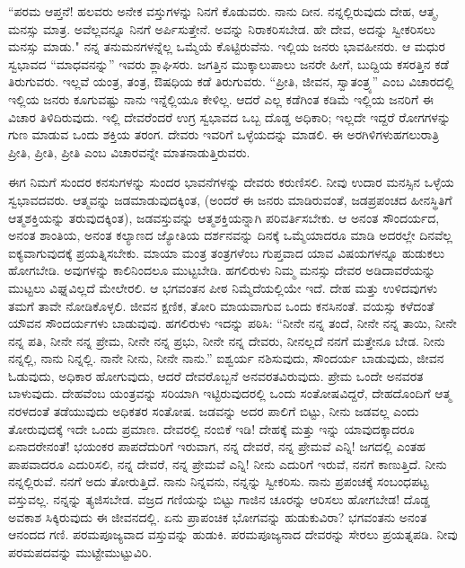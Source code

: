 ``ಪರಮ ಆಪ್ತನೆ! ಹಲವರು ಅನೇಕ ವಸ್ತುಗಳನ್ನು ನಿನಗೆ ಕೊಡುವರು. ನಾನು ದೀನ. ನನ್ನಲ್ಲಿರುವುದು ದೇಹ, ಆತ್ಮ, ಮನಸ್ಸು ಮಾತ್ರ. ಅವೆಲ್ಲವನ್ನೂ ನಿನಗೆ ಅರ್ಪಿಸುತ್ತೇನೆ. ಅವನ್ನು ನಿರಾಕರಿಸಬೇಡ. ಹೇ ದೇವ, ಅದನ್ನು ಸ್ವೀಕರಿಸಲು ಮನಸ್ಸು ಮಾಡು." ನನ್ನ ತನುಮನಗಳನ್ನೆಲ್ಲ ಒಮ್ಮೆಯೆ ಕೊಟ್ಟಿರುವೆನು. ಇಲ್ಲಿಯ ಜನರು ಭಾವಹೀನರು. ಆ ಮಧುರ ಸ್ವಭಾವದ ``ಮಾಧವನನ್ನು'' ಇವರು ಶ್ಲಾಘಿಸರು. ಜಗತ್ತಿನ ಮುಕ್ಕಾಲುಪಾಲು ಜನರೇ ಹೀಗೆ, ಬುದ್ದಿಯ ಕಸರತ್ತಿನ ಕಡೆ ತಿರುಗುವರು. ಇಲ್ಲವೆ ಯಂತ್ರ, ತಂತ್ರ, ಔಷಧಿಯ ಕಡೆ ತಿರುಗುವರು. ``ಪ್ರೀತಿ, ಜೀವನ, ಸ್ವಾತಂತ್ರ್ಯ'' ಎಂಬ ವಿಚಾರದಲ್ಲಿ ಇಲ್ಲಿಯ ಜನರು ಕೂಗುವಷ್ಟು ನಾನು ಇನ್ನೆಲ್ಲಿಯೂ ಕೇಳಿಲ್ಲ. ಆದರೆ ಎಲ್ಲ ಕಡೆಗಿಂತ ಕಡಿಮೆ ಇಲ್ಲಿಯ ಜನರಿಗೆ ಈ ವಿಚಾರ ತಿಳಿದಿರುವುದು. ಇಲ್ಲಿ ದೇವರೆಂದರೆ ಉಗ್ರ ಸ್ವಭಾವದ ಒಬ್ಬ ದೊಡ್ಡ ಅಧಿಕಾರಿ; ಇಲ್ಲದೇ ಇದ್ದರೆ ರೋಗಗಳನ್ನು ಗುಣ ಮಾಡುವ ಒಂದು ಶಕ್ತಿಯ ತರಂಗ. ದೇವರು ಇವರಿಗೆ ಒಳ್ಳೆಯದನ್ನು ಮಾಡಲಿ. ಈ ಅರಗಿಳಿಗಳುಹಗಲುರಾತ್ರಿ ಪ್ರೀತಿ, ಪ್ರೀತಿ, ಪ್ರೀತಿ ಎಂಬ ವಿಚಾರವನ್ನೇ ಮಾತನಾಡುತ್ತಿರುವರು.

ಈಗ ನಿಮಗೆ ಸುಂದರ ಕನಸುಗಳನ್ನು ಸುಂದರ ಭಾವನೆಗಳನ್ನು ದೇವರು ಕರುಣಿಸಲಿ. ನೀವು ಉದಾರ ಮನಸ್ಸಿನ ಒಳ್ಳೆಯ ಸ್ವಭಾವದವರು. ಆತ್ಮವನ್ನು ಜಡಮಾಡುವುದಕ್ಕಿಂತ, (ಅಂದರೆ ಈ ಜನರು ಮಾಡಿರುವಂತೆ, ಜಡಪ್ರಪಂಚದ ಹೀನಸ್ಥಿತಿಗೆ ಆತ್ಮಶಕ್ತಿಯನ್ನು ತರುವುದಕ್ಕಿಂತ), ಜಡವಸ್ತುವನ್ನು ಆತ್ಮಶಕ್ತಿಯನ್ನಾಗಿ ಪರಿವರ್ತಿಸಬೇಕು. ಆ ಅನಂತ ಸೌಂದರ್ಯದ, ಅನಂತ ಶಾಂತಿಯ, ಅನಂತ ಕಲ್ಯಾಣದ ಜ್ಯೋತಿಯ ದರ್ಶನವನ್ನು ದಿನಕ್ಕೆ ಒಮ್ಮೆಯಾದರೂ ಮಾಡಿ ಅದರಲ್ಲೇ ದಿನವೆಲ್ಲ ಐಕ್ಯವಾಗುವುದಕ್ಕೆ ಪ್ರಯತ್ನಿಸಬೇಕು. ಮಾಯಾ ಮಂತ್ರ ತಂತ್ರಗಳೆಂಬ ಗುಪ್ತವಾದ ಯಾವ ವಿಷಯಗಳನ್ನೂ ಹುಡುಕಲು ಹೋಗಬೇಡಿ. ಅವುಗಳನ್ನು ಕಾಲಿನಿಂದಲೂ ಮುಟ್ಟಬೇಡಿ. ಹಗಲಿರುಳು ನಿಮ್ಮ ಮನಸ್ಸು ದೇವರ ಅಡಿದಾವರೆಯನ್ನು ಮುಟ್ಟಲು ವಿಘ್ನವಿಲ್ಲದೆ ಮೇಲೇರಲಿ. ಆ ಭಗವಂತನ ಪೀಠ ನಿಮ್ಮೆದೆಯಲ್ಲಿಯೇ ಇದೆ. ದೇಹ ಮತ್ತು ಉಳಿದವುಗಳು ತಮಗೆ ತಾವೇ ನೋಡಿಕೊಳ್ಳಲಿ. ಜೀವನ ಕ್ಷಣಿಕ, ತೋರಿ ಮಾಯವಾಗುವ ಒಂದು ಕನಸಿನಂತೆ. ವಯಸ್ಸು ಕಳೆದಂತೆ ಯೌವನ ಸೌಂದರ್ಯಗಳು ಬಾಡುವುವು. ಹಗಲಿರುಳು ಇದನ್ನು ಪಠಿಸಿ: ``ನೀನೇ ನನ್ನ ತಂದೆ, ನೀನೇ ನನ್ನ ತಾಯಿ, ನೀನೇ ನನ್ನ ಪತಿ, ನೀನೇ ನನ್ನ ಪ್ರೇಮ, ನೀನೇ ನನ್ನ ಪ್ರಭು, ನೀನೇ ನನ್ನ ದೇವರು, ನೀನಲ್ಲದೆ ನನಗೆ ಮತ್ತೇನೂ ಬೇಡ. ನೀನು ನನ್ನಲ್ಲಿ, ನಾನು ನಿನ್ನಲ್ಲಿ. ನಾನೇ ನೀನು, ನೀನೇ ನಾನು.'' ಐಶ್ವರ್ಯ ನಶಿಸುವುದು, ಸೌಂದರ್ಯ ಬಾಡುವುದು, ಜೀವನ ಓಡುವುದು, ಅಧಿಕಾರ ಹೋಗುವುದು, ಆದರೆ ದೇವರೊಬ್ಬನೆ ಅನವರತವಿರುವುದು. ಪ್ರೇಮ ಒಂದೇ ಅನವರತ ಬಾಳುವುದು. ದೇಹವೆಂಬ ಯಂತ್ರವನ್ನು ಸರಿಯಾಗಿ ಇಟ್ಟಿರುವುದರಲ್ಲಿ ಒಂದು ಸಂತೋಷವಿದ್ದರೆ, ದೇಹದೊಂದಿಗೆ ಆತ್ಮ ನರಳದಂತೆ ತಡೆಯುವುದು ಅಧಿಕತರ ಸಂತೋಷ. ಜಡವನ್ನು ಅದರ ಪಾಲಿಗೆ ಬಿಟ್ಟು, ನೀನು ಜಡವಲ್ಲ ಎಂದು ತೋರುವುದಕ್ಕೆ ಇದೇ ಒಂದು ಪ್ರಮಾಣ. ದೇವರಲ್ಲಿ ನಂಬಿಕೆ ಇಡಿ! ದೇಹಕ್ಕೆ ಮತ್ತು ಇನ್ನು ಯಾವುದಕ್ಕಾದರೂ ಏನಾದರೇನಂತೆ! ಭಯಂಕರ ಪಾಪದೆದುರಿಗೆ ಇರುವಾಗ, ನನ್ನ ದೇವರೆ, ನನ್ನ ಪ್ರೇಮವೆ ಎನ್ನಿ! ಜಗದಲ್ಲಿ ಎಂತಹ ಪಾಪವಾದರೂ ಎದುರಿಸಲಿ, ನನ್ನ ದೇವರೆ, ನನ್ನ ಪ್ರೇಮವೆ ಎನ್ನಿ! ನೀನು ಎದುರಿಗೆ ಇರುವೆ, ನನಗೆ ಕಾಣುತ್ತಿದೆ. ನೀನು ನನ್ನಲ್ಲಿರುವೆ. ನನಗೆ ಅದು ತೋರುತ್ತಿದೆ. ನಾನು ನಿನ್ನವನು, ನನ್ನನ್ನು ಸ್ವೀಕರಿಸು. ನಾನು ಪ್ರಪಂಚಕ್ಕೆ ಸಂಬಂಧಪಟ್ಟ ವಸ್ತುವಲ್ಲ. ನನ್ನನ್ನು ತ್ಯಜಿಸಬೇಡ. ವಜ್ರದ ಗಣಿಯನ್ನು ಬಿಟ್ಟು ಗಾಜಿನ ಚೂರನ್ನು ಆರಿಸಲು ಹೋಗಬೇಡ! ದೊಡ್ಡ ಅವಕಾಶ ಸಿಕ್ಕಿರುವುದು ಈ ಜೀವನದಲ್ಲಿ. ಏನು ಪ್ರಾಪಂಚಿಕ ಭೋಗವನ್ನು ಹುಡುಕುವಿರಾ? ಭಗವಂತನು ಅನಂತ ಆನಂದದ ಗಣಿ. ಪರಮಪೂಜ್ಯವಾದ ವಸ್ತುವನ್ನು ಹುಡುಕಿ. ಪರಮಪೂಜ್ಯನಾದ ದೇವರನ್ನು ಸೇರಲು ಪ್ರಯತ್ನಪಡಿ. ನೀವು ಪರಮಪದವನ್ನು ಮುಟ್ಟೇಮುಟ್ಟುವಿರಿ.

